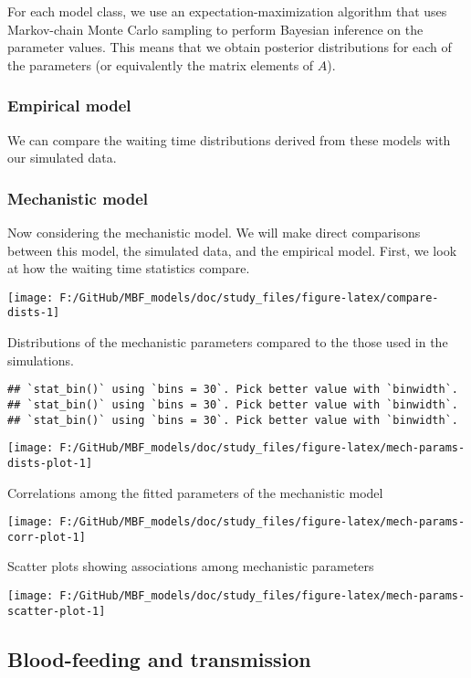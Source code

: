 \documentclass[
]{article}
\begin{document}
For each model class, we use an expectation-maximization algorithm that
uses Markov-chain Monte Carlo sampling to perform Bayesian inference on
the parameter values. This means that we obtain posterior distributions
for each of the parameters (or equivalently the matrix elements of
\(A\)).

\subsubsection{Empirical model}\label{empirical-model}

We can compare the waiting time distributions derived from these models
with our simulated data.

\subsubsection{Mechanistic model}\label{mechanistic-model}

Now considering the mechanistic model. We will make direct comparisons
between this model, the simulated data, and the empirical model. First,
we look at how the waiting time statistics compare.

\texttt{[image: F:/GitHub/MBF\_models/doc/study\_files/figure-latex/compare-dists-1]}

Distributions of the mechanistic parameters compared to the those used
in the simulations.

\begin{verbatim}
## `stat_bin()` using `bins = 30`. Pick better value with `binwidth`.
## `stat_bin()` using `bins = 30`. Pick better value with `binwidth`.
## `stat_bin()` using `bins = 30`. Pick better value with `binwidth`.
\end{verbatim}

\texttt{[image: F:/GitHub/MBF\_models/doc/study\_files/figure-latex/mech-params-dists-plot-1]}

Correlations among the fitted parameters of the mechanistic model

\texttt{[image: F:/GitHub/MBF\_models/doc/study\_files/figure-latex/mech-params-corr-plot-1]}

Scatter plots showing associations among mechanistic parameters

\texttt{[image: F:/GitHub/MBF\_models/doc/study\_files/figure-latex/mech-params-scatter-plot-1]}

\subsection{Blood-feeding and
transmission}\label{blood-feeding-and-transmission}
\end{document}
